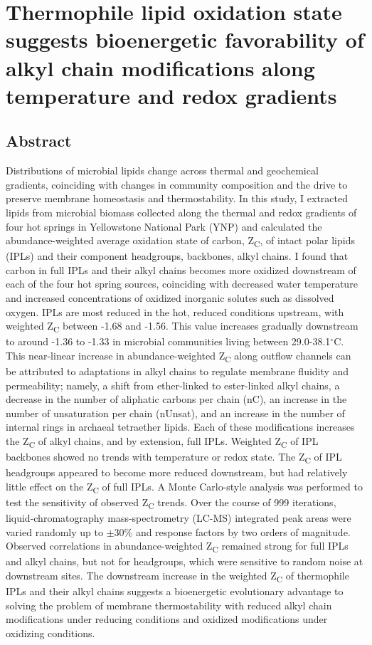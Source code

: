 \chapter[THERMOPHILE LIPID OXIDATION STATE SUGGESTS BIOENERGETIC FAVORABILITY OF ALKYL CHAIN MODIFICATIONS ALONG TEMPERATURE AND REDOX GRADIENTS]{Thermophile lipid oxidation state suggests bioenergetic favorability of alkyl chain modifications along temperature and redox gradients}\label{ch1}

\section{Abstract}
Distributions of microbial lipids change across thermal and geochemical gradients, coinciding with changes in community composition and the drive to preserve membrane homeostasis and thermostability. In this study, I extracted lipids from microbial biomass collected along the thermal and redox gradients of four hot springs in Yellowstone National Park (YNP) and calculated the abundance-weighted average oxidation state of carbon, Z\textsubscript{C}, of intact polar lipids (IPLs) and their component headgroups, backbones, alkyl chains. I found that carbon in full IPLs and their alkyl chains becomes more oxidized downstream of each of the four hot spring sources, coinciding with decreased water temperature and increased concentrations of oxidized inorganic solutes such as dissolved oxygen. IPLs are most reduced in the hot, reduced conditions upstream, with weighted Z\textsubscript{C} between -1.68 and -1.56. This value increases gradually downstream to around -1.36 to -1.33 in microbial communities living between 29.0-38.1$^\circ$C. This near-linear increase in abundance-weighted Z\textsubscript{C} along outflow channels can be attributed to adaptations in alkyl chains to regulate membrane fluidity and permeability; namely, a shift from ether-linked to ester-linked alkyl chains, a decrease in the number of aliphatic carbons per chain (nC), an increase in the number of unsaturation per chain (nUnsat), and an increase in the number of internal rings in archaeal tetraether lipids. Each of these modifications increases the Z\textsubscript{C} of alkyl chains, and by extension, full IPLs. Weighted Z\textsubscript{C} of IPL backbones showed no trends with temperature or redox state. The Z\textsubscript{C} of IPL headgroups appeared to become more reduced downstream, but had relatively little effect on the Z\textsubscript{C} of full IPLs. A Monte Carlo-style analysis was performed to test the sensitivity of observed Z\textsubscript{C} trends. Over the course of 999 iterations, liquid-chromatography mass-spectrometry (LC-MS) integrated peak areas were varied randomly up to $\pm$30\% and response factors by two orders of magnitude. Observed correlations in abundance-weighted Z\textsubscript{C} remained strong for full IPLs and alkyl chains, but not for headgroups, which were sensitive to random noise at downstream sites. The downstream increase in the weighted Z\textsubscript{C} of thermophile IPLs and their alkyl chains suggests a bioenergetic evolutionary advantage to solving the problem of membrane thermostability with reduced alkyl chain modifications under reducing conditions and oxidized modifications under oxidizing conditions.

